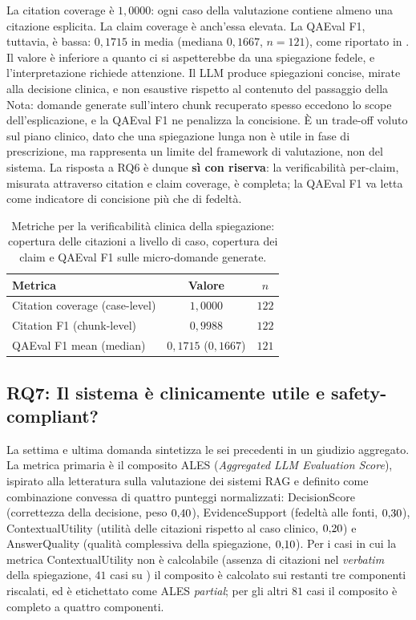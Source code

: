 La citation coverage è $1{,}0000$: ogni caso della valutazione contiene almeno una citazione esplicita. La claim coverage è anch'essa elevata. La QAEval F1, tuttavia, è bassa: $0{,}1715$ in media (mediana $0{,}1667$, $n=121$), come riportato in . Il valore è inferiore a quanto ci si aspetterebbe da una spiegazione fedele, e l'interpretazione richiede attenzione. Il LLM produce spiegazioni concise, mirate alla decisione clinica, e non esaustive rispetto al contenuto del passaggio della Nota: domande generate sull'intero chunk recuperato spesso eccedono lo scope dell'esplicazione, e la QAEval F1 ne penalizza la concisione. È un trade-off voluto sul piano clinico, dato che una spiegazione lunga non è utile in fase di prescrizione, ma rappresenta un limite del framework di valutazione, non del sistema. La risposta a RQ6 è dunque \textbf{sì con riserva}: la verificabilità per-claim, misurata attraverso citation e claim coverage, è completa; la QAEval F1 va letta come indicatore di concisione più che di fedeltà.

\begin{table}[t]
  \centering
  \caption{Metriche per la verificabilità clinica della spiegazione: copertura delle citazioni a livello di caso, copertura dei claim e QAEval F1 sulle micro-domande generate.}
  \label{tab:rq6}
  \small
  \begin{tabular}{lcc}
    \toprule
    Metrica & Valore & $n$ \\
    \midrule
    Citation coverage (case-level) & $1{,}0000$ & $122$ \\
    Citation F1 (chunk-level)      & $0{,}9988$ & $122$ \\
    QAEval F1 mean (median)        & $0{,}1715$ ($0{,}1667$) & $121$ \\
    \bottomrule
  \end{tabular}
\end{table}

\subsection{RQ7: Il sistema è clinicamente utile e safety-compliant?}
\label{sec:rq7}

La settima e ultima domanda sintetizza le sei precedenti in un giudizio aggregato. La metrica primaria è il composito ALES (\emph{Aggregated LLM Evaluation Score}), ispirato alla letteratura sulla valutazione dei sistemi RAG e definito come combinazione convessa di quattro punteggi normalizzati: DecisionScore (correttezza della decisione, peso $0{,}40$), EvidenceSupport (fedeltà alle fonti, $0{,}30$), ContextualUtility (utilità delle citazioni rispetto al caso clinico, $0{,}20$) e AnswerQuality (qualità complessiva della spiegazione, $0{,}10$). Per i casi in cui la metrica ContextualUtility non è calcolabile (assenza di citazioni nel \emph{verbatim} della spiegazione, $41$ casi su \goldn) il composito è calcolato sui restanti tre componenti riscalati, ed è etichettato come ALES \emph{partial}; per gli altri $81$ casi il composito è completo a quattro componenti.

